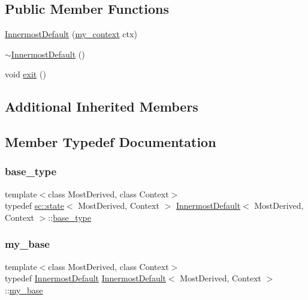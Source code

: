 \subsection*{Public Member Functions}
\begin{DoxyCompactItemize}
\item 
\mbox{\hyperlink{struct_innermost_default_ac1a90ebc7db2bccb09cbcd098e319944}{Innermost\+Default}} (\mbox{\hyperlink{struct_innermost_default_a0aab337364dec3101e80f293b709d53d}{my\+\_\+context}} ctx)
\item 
\mbox{\hyperlink{struct_innermost_default_ab2d1dda2c58305deca92d83ca2d5e2c9}{$\sim$\+Innermost\+Default}} ()
\item 
void \mbox{\hyperlink{struct_innermost_default_a1676dc4b5accc3396d76ee38277e4d44}{exit}} ()
\end{DoxyCompactItemize}
\subsection*{Additional Inherited Members}


\subsection{Member Typedef Documentation}
\mbox{\label{struct_innermost_default_a4b29ec4327dbb23adac6b62bee2d719f}} 
\subsubsection{\texorpdfstring{base\+\_\+type}{base\_type}}
{\footnotesize\ttfamily template$<$class Most\+Derived, class Context$>$ \\
typedef \mbox{\hyperlink{classboost_1_1statechart_1_1state}{sc\+::state}}$<$ Most\+Derived, Context $>$ \mbox{\hyperlink{struct_innermost_default}{Innermost\+Default}}$<$ Most\+Derived, Context $>$\+::\mbox{\hyperlink{struct_innermost_default_a4b29ec4327dbb23adac6b62bee2d719f}{base\+\_\+type}}}

\mbox{\label{struct_innermost_default_ac389fcf982a5cc72aa61a8ee2e0f4699}} 
\subsubsection{\texorpdfstring{my\+\_\+base}{my\_base}}
{\footnotesize\ttfamily template$<$class Most\+Derived, class Context$>$ \\
typedef \mbox{\hyperlink{struct_innermost_default}{Innermost\+Default}} \mbox{\hyperlink{struct_innermost_default}{Innermost\+Default}}$<$ Most\+Derived, Context $>$\+::\mbox{\hyperlink{struct_innermost_default_ac389fcf982a5cc72aa61a8ee2e0f4699}{my\+\_\+base}}}

